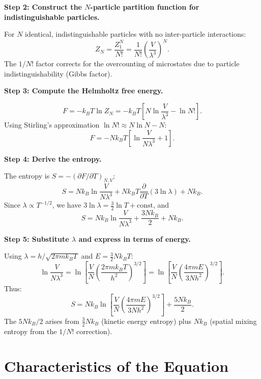 \textbf{Step 2: Construct the $N$-particle partition function for indistinguishable particles.}

For $N$ identical, indistinguishable particles with no inter-particle interactions:
\begin{equation}
Z_N = \frac{Z_1^N}{N!} = \frac{1}{N!}\left(\frac{V}{\lambda^3}\right)^N.
\end{equation}
The $1/N!$ factor corrects for the overcounting of microstates due to particle indistinguishability (Gibbs factor).

\textbf{Step 3: Compute the Helmholtz free energy.}

\begin{equation}
F = -k_BT\ln Z_N = -k_BT\left[N\ln\frac{V}{\lambda^3} - \ln N!\right].
\end{equation}
Using Stirling's approximation $\ln N! \approx N\ln N - N$:
\begin{equation}
F = -Nk_BT\left[\ln\frac{V}{N\lambda^3} + 1\right].
\end{equation}

\textbf{Step 4: Derive the entropy.}

The entropy is $S = -(\partial F/\partial T)_{N,V}$:
\begin{equation}
S = Nk_B\ln\frac{V}{N\lambda^3} + Nk_BT\frac{\partial}{\partial T}(3\ln\lambda) + Nk_B.
\end{equation}
Since $\lambda \propto T^{-1/2}$, we have $3\ln\lambda = \frac{3}{2}\ln T + \text{const}$, and
\begin{equation}
S = Nk_B\ln\frac{V}{N\lambda^3} + \frac{3Nk_B}{2} + Nk_B.
\end{equation}

\textbf{Step 5: Substitute $\lambda$ and express in terms of energy.}

Using $\lambda = h/\sqrt{2\pi m k_BT}$ and $E = \frac{3}{2}Nk_BT$:
\begin{equation}
\ln\frac{V}{N\lambda^3} = \ln\left[\frac{V}{N}\left(\frac{2\pi mk_BT}{h^2}\right)^{3/2}\right] = \ln\left[\frac{V}{N}\left(\frac{4\pi m E}{3Nh^2}\right)^{3/2}\right].
\end{equation}
Thus:
\begin{equation}
\boxed{S = Nk_B\ln\left[\frac{V}{N}\left(\frac{4\pi m E}{3Nh^2}\right)^{3/2}\right] + \frac{5Nk_B}{2}.}
\end{equation}
The $5Nk_B/2$ arises from $\frac{3}{2}Nk_B$ (kinetic energy entropy) plus $Nk_B$ (spatial mixing entropy from the $1/N!$ correction).

\section*{Characteristics of the Equation}

